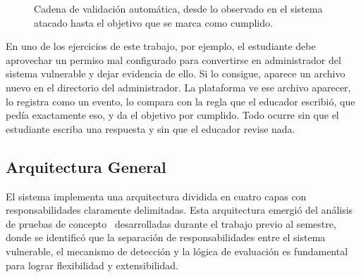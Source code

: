 \begin{figure}[H]
    \centering
    \resizebox{\textwidth}{!}{}
    \caption{Cadena de validación automática, desde lo observado en el sistema
    atacado hasta el objetivo que se marca como cumplido.}
    \label{fig:cadena-validacion}
\end{figure}
En uno de los ejercicios de este trabajo, por ejemplo, 
el estudiante debe aprovechar un permiso mal configurado para
convertirse en administrador del sistema vulnerable y dejar evidencia de ello.
Si lo consigue, aparece un archivo nuevo en el directorio del administrador. La
plataforma ve ese archivo aparecer, lo registra como un evento, lo compara con
la regla que el educador escribió, que pedía exactamente eso, y da el objetivo
por cumplido. Todo ocurre sin que el estudiante escriba una respuesta y sin que
el educador revise nada.

\subsection{Arquitectura General}

El sistema implementa una arquitectura dividida en cuatro capas con
responsabilidades claramente delimitadas. Esta arquitectura emergió del análisis
de pruebas de concepto~\cite{flexipwn-poc} desarrolladas durante el trabajo
previo al semestre, donde se identificó que la separación de responsabilidades
entre el sistema vulnerable, el mecanismo de detección y la lógica de evaluación
es fundamental para lograr flexibilidad y extensibilidad.

